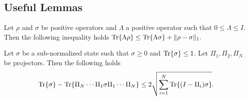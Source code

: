 
\subsection{Useful Lemmas}
\label{app:useful lemmas}
\begin{lemma}\label{app:lemma:traceinequality}
    Let $\rho$ and $\sigma$ be positive operators and $\Lambda$ a positive operator such that $0\leq \Lambda\leq I$. Then the following inequality holds
    $\text{Tr}\{\Lambda \rho\} \leq \text{Tr}\{\Lambda \sigma\}+\|\rho-\sigma\|_1.$
\end{lemma}
\begin{lemma}
   Let $\sigma$ be a sub-normalized state such that $\sigma\geq 0$ and $\text{Tr}\{\sigma\}\leq 1$. Let $\Pi_1,\Pi_2, \Pi_N$ be projectors. Then the following holds 
   $$\text{Tr}\{\sigma\} - \text{Tr}\{\Pi_N\cdots\Pi_1\sigma\Pi_1\cdots\Pi_N\} \leq 2\sqrt{\sum_{i=1}^N\text{Tr}\{(I-\Pi_i)\sigma\}}.$$
\end{lemma}

